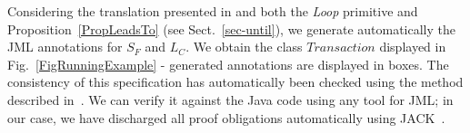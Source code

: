 Considering the translation presented in \cite{Huis02} and both 
the \textit{Loop} primitive and  Proposition~\ref{PropLeadsTo} 
(see Sect.~\ref{sec-until}), we generate automatically the
JML annotations for $S_F$ and $L_C$. 
We obtain the class $Transaction$ displayed in Fig.~\ref{FigRunningExample}
- generated annotations are displayed in boxes. 
The consistency of this
specification has automatically been checked using the method described in~\cite{bdgZB05}. 
We can verify it against the Java code using any tool for JML; 
in our case, we have discharged
all proof obligations
 automatically using JACK~\cite{BurdyRL03}.



